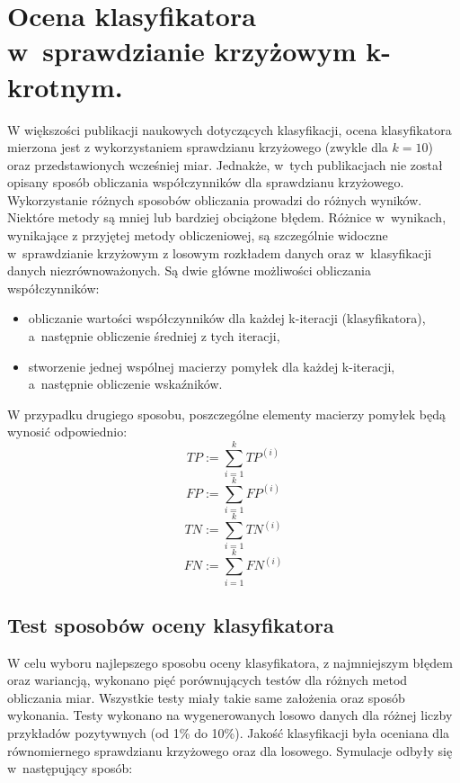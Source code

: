 \section{Ocena klasyfikatora w~sprawdzianie krzyżowym k-krotnym.}
W większości publikacji naukowych dotyczących klasyfikacji, ocena klasyfikatora mierzona jest z wykorzystaniem sprawdzianu krzyżowego (zwykle dla $k=10$) oraz przedstawionych wcześniej miar. Jednakże, w~tych publikacjach nie został opisany sposób obliczania współczynników dla sprawdzianu krzyżowego. Wykorzystanie różnych sposobów obliczania prowadzi do różnych wyników. Niektóre metody są mniej lub bardziej obciążone błędem. Różnice w~wynikach, wynikające z przyjętej metody obliczeniowej, są szczególnie widoczne w~sprawdzianie krzyżowym z losowym rozkładem danych oraz w~klasyfikacji danych niezrównoważonych. Są dwie główne możliwości obliczania współczynników:
\begin{itemize}
	\item obliczanie wartości współczynników dla każdej k-iteracji (klasyfikatora), a~następnie obliczenie średniej z tych iteracji,
	\item stworzenie jednej wspólnej macierzy pomyłek dla każdej k-iteracji, a~następnie obliczenie wskaźników.
\end{itemize}
W przypadku drugiego sposobu, poszczególne elementy macierzy pomyłek będą wynosić odpowiednio:
\[TP := \sum_{i=1}^{k} TP^{(i)}\]
\[FP := \sum_{i=1}^{k} FP^{(i)}\]
\[TN := \sum_{i=1}^{k} TN^{(i)}\]
\[FN := \sum_{i=1}^{k} FN^{(i)}\]
\subsection{Test sposobów oceny klasyfikatora}
W celu wyboru najlepszego sposobu oceny klasyfikatora, z najmniejszym błędem oraz wariancją, wykonano pięć porównujących testów dla różnych metod obliczania miar. Wszystkie testy miały takie same założenia oraz sposób wykonania. Testy wykonano na wygenerowanych losowo danych dla różnej liczby przykładów pozytywnych (od 1\% do 10\%). Jakość klasyfikacji była oceniana dla równomiernego sprawdzianu krzyżowego oraz dla losowego. Symulacje odbyły się w~następujący sposób:

